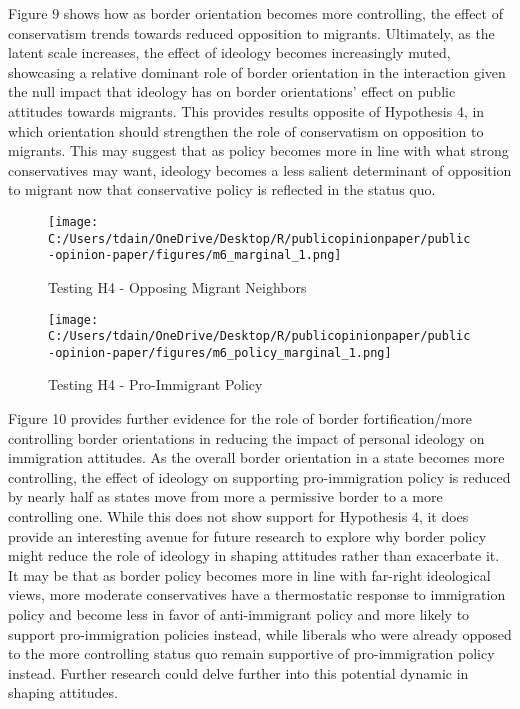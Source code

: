 \documentclass[12pt,]{article}
\begin{document}
Figure 9 shows how as border orientation becomes more controlling, the
effect of conservatism trends towards reduced opposition to migrants.
Ultimately, as the latent scale increases, the effect of ideology
becomes increasingly muted, showcasing a relative dominant role of
border orientation in the interaction given the null impact that
ideology has on border orientations' effect on public attitudes towards
migrants. This provides results opposite of Hypothesis 4, in which
orientation should strengthen the role of conservatism on opposition to
migrants. This may suggest that as policy becomes more in line with what
strong conservatives may want, ideology becomes a less salient
determinant of opposition to migrant now that conservative policy is
reflected in the status quo.

\begin{figure}
\centering
\texttt{[image: C:/Users/tdain/OneDrive/Desktop/R/publicopinionpaper/public-opinion-paper/figures/m6\_marginal\_1.png]}
\caption{Testing H4 - Opposing Migrant Neighbors}
\end{figure}

\begin{figure}
\centering
\texttt{[image: C:/Users/tdain/OneDrive/Desktop/R/publicopinionpaper/public-opinion-paper/figures/m6\_policy\_marginal\_1.png]}
\caption{Testing H4 - Pro-Immigrant Policy}
\end{figure}

Figure 10 provides further evidence for the role of border
fortification/more controlling border orientations in reducing the
impact of personal ideology on immigration attitudes. As the overall
border orientation in a state becomes more controlling, the effect of
ideology on supporting pro-immigration policy is reduced by nearly half
as states move from more a permissive border to a more controlling one.
While this does not show support for Hypothesis 4, it does provide an
interesting avenue for future research to explore why border policy
might reduce the role of ideology in shaping attitudes rather than
exacerbate it. It may be that as border policy becomes more in line with
far-right ideological views, more moderate conservatives have a
thermostatic response to immigration policy and become less in favor of
anti-immigrant policy and more likely to support pro-immigration
policies instead, while liberals who were already opposed to the more
controlling status quo remain supportive of pro-immigration policy
instead. Further research could delve further into this potential
dynamic in shaping attitudes.
\end{document}
